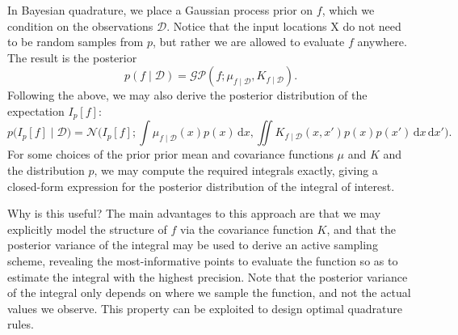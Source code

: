 \documentclass{article}
\newcommand{\given}{\mid}
\newcommand{\mc}[1]{\mathcal{#1}}
\newcommand{\data}{\mc{D}}
\newcommand{\intd}[1]{\,\mathrm{d}{#1}}
\newcommand{\mat}[1]{\bm{\mathrm{#1}}}
\begin{document}
In Bayesian quadrature, we place a Gaussian process prior on $f$,
which we condition on the observations $\data$.  Notice that the input
locations $\mat{X}$ do not need to be random samples from $p$, but
rather we are allowed to evaluate $f$ anywhere.  The result is the posterior
\begin{equation*}
  p(f \given \data)
  =
  \mc{GP}(f; \mu_{f \given \data}, K_{f \given \data}).
\end{equation*}
Following the above, we may also derive the posterior distribution
of the expectation $I_p[f]:$
\begin{equation*}
  p\bigl(I_p[f] \given \data \bigr)
  =
  \mc{N}
  \biggl(
  I_p[f];
  \int \mu_{f \given \data}(x) p(x) \intd{x},
  \iint K_{f \given \data}(x, x') p(x) p(x') \intd{x} \intd{x'}
  \biggr).
\end{equation*}
For some choices of the prior prior mean and covariance functions
$\mu$ and $K$ and the distribution $p$, we may compute the required
integrals exactly, giving a closed-form expression for the posterior
distribution of the integral of interest.

Why is this useful?  The main advantages to this approach are that we
may explicitly model the structure of $f$ via the covariance function
$K$, and that the posterior variance of the integral may be used to
derive an active sampling scheme, revealing the most-informative
points to evaluate the function so as to estimate the integral with
the highest precision.  Note that the posterior variance of the
integral only depends on where we sample the function, and not the
actual values we observe.  This property can be exploited to design
optimal quadrature rules.
\end{document}
